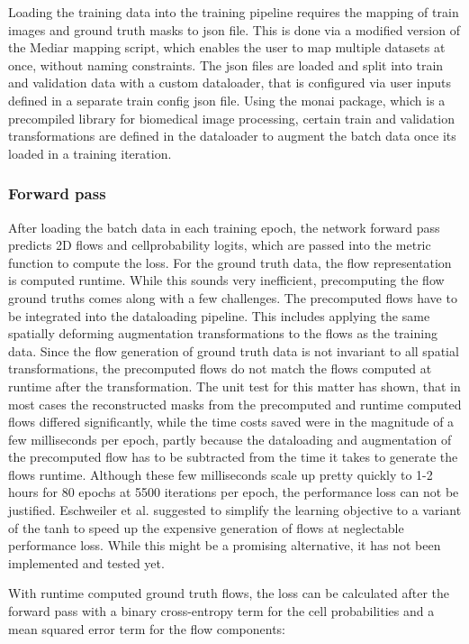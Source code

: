 Loading the training data into the training pipeline requires the mapping of train images and ground truth masks to json file. This is done via a modified version of the Mediar mapping script, which enables the user to map multiple datasets at once, without naming constraints. The json files are loaded and split into train and validation data with a custom dataloader, that is configured via user inputs defined in a separate train config json file. Using the monai package, which is a precompiled library for biomedical image processing, certain train and validation transformations are defined in the dataloader to augment the batch data once its loaded in a training iteration.

\subsubsection{Forward pass}
After loading the batch data in each training epoch, the network forward pass predicts 2D flows and cellprobability logits, which are passed into the metric function to compute the loss. For the ground truth data, the flow representation is computed runtime. While this sounds very inefficient, precomputing the flow ground truths comes along with a few challenges. The precomputed flows have to be integrated into the dataloading pipeline. This includes applying the same spatially deforming augmentation transformations to the flows as the training data. Since the flow generation of ground truth data is not invariant to all spatial transformations, the precomputed flows do not match the flows computed at runtime after the transformation. The unit test for this matter has shown, that in most cases the reconstructed masks from the precomputed and runtime computed flows differed significantly, while the time costs saved were in the magnitude of a few milliseconds per epoch, partly because the dataloading and augmentation of the precomputed flow has to be subtracted from the time it takes to generate the flows runtime. Although these few milliseconds scale up pretty quickly to 1-2 hours for 80 epochs at 5500 iterations per epoch, the performance loss can not be justified. Eschweiler et al. \cite{eschweiler2022robust3dcellsegmentation} suggested to simplify the learning objective to a variant of the tanh to speed up the expensive generation of flows at neglectable performance loss. While this might be a promising alternative, it has not been implemented and tested yet.

With runtime computed ground truth flows, the loss can be calculated after the forward pass with a binary cross-entropy term for the cell probabilities and a mean squared error term for the flow components:

